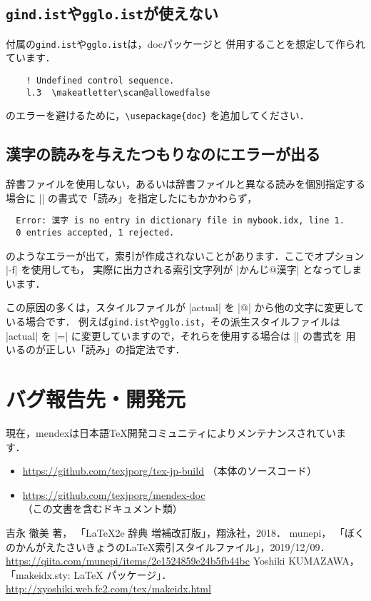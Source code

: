 \documentclass[a4paper,dvipdfmx]{jsarticle}
\newcommand{\SoftName}[1]{\textsf{#1}}
\newcommand{\FileName}[1]{\texttt{#1}}
\begin{document}
\subsection{\FileName{gind.ist}や\FileName{gglo.ist}が使えない}
\LaTeXe 付属の\FileName{gind.ist}や\FileName{gglo.ist}は，\SoftName{doc}パッケージと
併用することを想定して作られています．
\begin{verbatim}
    ! Undefined control sequence.
    l.3  \makeatletter\scan@allowedfalse
\end{verbatim}
のエラーを避けるために，\verb+\usepackage{doc}+ を追加してください．

\subsection{漢字の読みを与えたつもりなのにエラーが出る}
辞書ファイルを使用しない，あるいは辞書ファイルと異なる読みを個別指定する場合に
|| の書式で「読み」を指定したにもかかわらず，
\begin{verbatim}
  Error: 漢字 is no entry in dictionary file in mybook.idx, line 1.
  0 entries accepted, 1 rejected.
\end{verbatim}
のようなエラーが出て，索引が作成されないことがあります．ここでオプション |-f| を使用しても，
実際に出力される索引文字列が |かんじ@漢字| となってしまいます．

この原因の多くは，スタイルファイルが |actual| を |@| から他の文字に変更している場合です．
例えば\FileName{gind.ist}や\FileName{gglo.ist}，その派生スタイルファイルは
|actual| を |=| に変更していますので，それらを使用する場合は || の書式を
用いるのが正しい「読み」の指定法です．

\section{バグ報告先・開発元}
現在，\SoftName{mendex}は日本語\TeX 開発コミュニティによりメンテナンスされています．
\begin{itemize}
  \item \url{https://github.com/texjporg/tex-jp-build} （本体のソースコード）
  \item \url{https://github.com/texjporg/mendex-doc} （この文書を含むドキュメント類）
\end{itemize}

\begin{thebibliography}{99}
  吉永 徹美 著，
   「LaTeX2e 辞典 増補改訂版」，翔泳社，2018．
  munepi，
   「ぼくのかんがえたさいきょうのLaTeX索引スタイルファイル」，2019/12/09．\\
   \url{https://qiita.com/munepi/items/2e1524859e24b5fb44bc}
  Yoshiki KUMAZAWA，
   「makeidx.sty: LaTeX パッケージ」．\\
   \url{http://xyoshiki.web.fc2.com/tex/makeidx.html}
\end{thebibliography}
\end{document}
